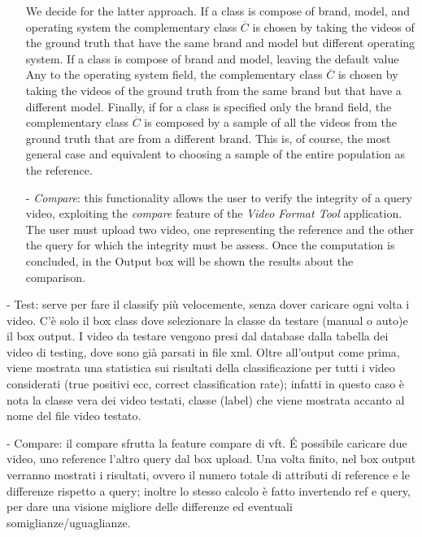 \begin{itemize}
We decide for the latter approach.
If a class is compose of brand, model, and operating system the complementary class $\overline{C}$ is chosen by taking the videos of the ground truth that have the same brand and model but different operating system.
If a class is compose of brand and model, leaving the default value Any to the operating system field, the complementary class $\overline{C}$ is chosen by taking the videos of the ground truth from the same brand but that have a different model.
Finally, if for a class is specified only the brand field, the complementary class $\overline{C}$ is composed by a sample of all the videos from the ground truth that are from a different brand. This is, of course, the most general case and equivalent to choosing a sample of the entire population as the reference.

\item[-] \emph{Compare}: this functionality allows the user to verify the integrity of a query video, exploiting the \emph{compare} feature of the \emph{Video Format Tool} application. The user must upload two video, one representing the reference and the other the query for which the integrity must be assess. Once the computation is concluded, in the Output box will be shown the results about the comparison.


\end{itemize}



- Test:
 serve per fare il classify più velocemente, senza dover caricare ogni volta i video. C'è solo il box class dove selezionare la classe da testare (manual o auto)e il box output. I video da testare vengono presi dal database dalla tabella dei video di testing, dove sono già parsati in file xml. Oltre all'output come prima, viene mostrata una statistica sui risultati della classificazione per tutti i video considerati (true positivi ecc, correct classification rate); infatti in questo caso è nota la classe vera dei video testati, classe (label) che viene mostrata accanto al nome del file video testato.

- Compare:
 il compare sfrutta la feature compare di vft. É possibile caricare due video, uno reference l'altro query dal box upload. Una volta finito, nel box output verranno mostrati i risultati, ovvero il numero totale di attributi di reference e le differenze rispetto a query; inoltre lo stesso calcolo è fatto invertendo ref e query, per dare una visione migliore delle differenze ed eventuali somiglianze/uguaglianze.

